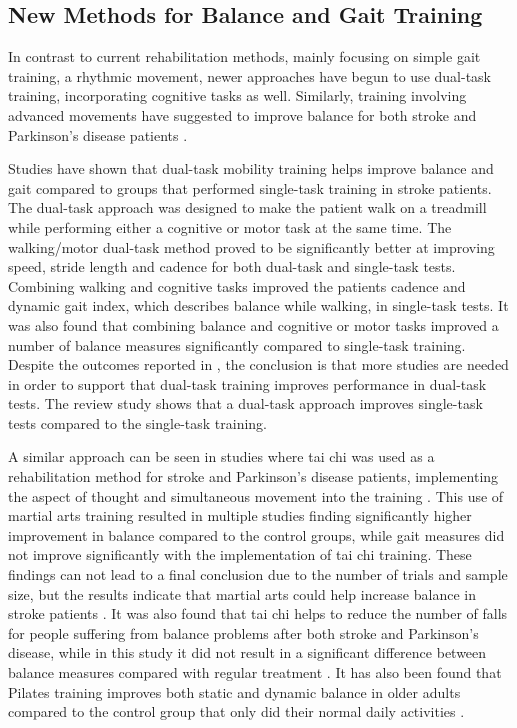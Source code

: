 \subsection{New Methods for Balance and Gait Training}

In contrast to current rehabilitation methods, mainly focusing on simple gait training, a rhythmic movement, newer approaches have begun to use dual-task training, incorporating cognitive tasks as well. Similarly, training involving advanced movements have suggested to improve balance for both stroke and Parkinson's disease patients \cite{Ding2012,Winser2018}. 

Studies have shown that dual-task mobility training helps improve balance and gait compared to groups that performed single-task training in stroke patients. The dual-task approach was designed to make the patient walk on a treadmill while performing either a cognitive or motor task at the same time. \cite{He2018}
The walking/motor dual-task method proved to be significantly better at improving speed, stride length and cadence for both dual-task and single-task tests. Combining walking and cognitive tasks improved the patients cadence and dynamic gait index, which describes balance while walking, in single-task tests. It was also found that combining balance and cognitive or motor tasks improved a number of balance measures significantly compared to single-task training. \cite{He2018}
Despite the outcomes reported in \cite{He2018}, the conclusion is that more studies are needed in order to support that dual-task training improves performance in dual-task tests. The review study shows that a dual-task approach improves single-task tests compared to the single-task training. \cite{He2018}

A similar approach can be seen in studies where tai chi was used as a rehabilitation method for stroke and Parkinson's disease patients, implementing the aspect of thought and simultaneous movement into the training \cite{Ding2012,Winser2018}. This use of martial arts training resulted in multiple studies finding significantly higher improvement in balance compared to the control groups, while gait measures did not improve significantly with the implementation of tai chi training. \cite{Ding2012}
These findings can not lead to a final conclusion due to the number of trials and sample size, but the results indicate that martial arts could help increase balance in stroke patients \cite{Ding2012}. It was also found that tai chi helps to reduce the number of falls for people suffering from balance problems after both stroke and Parkinson's disease, while in this study it did not result in a significant difference between balance measures compared with regular treatment \cite{Winser2018}. It has also been found that Pilates training improves both static and dynamic balance in older adults compared to the control group that only did their normal daily activities \cite{Moreno2017}.